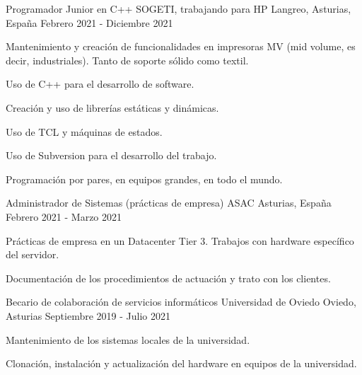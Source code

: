\begin{cventries}
    \cventry
    {Programador Junior en C++} %
    {SOGETI, trabajando para HP} %
    {Langreo, Asturias, España} %
    {Febrero 2021 - Diciembre 2021} %
    {
        \begin{cvitems} %
            \item {Mantenimiento y creación de funcionalidades en impresoras MV (mid volume, es decir, industriales).
                        Tanto de soporte sólido como textil.}
            \item {Uso de C++ para el desarrollo de software.}
            \item {Creación y uso de librerías estáticas y dinámicas.}
            \item {Uso de TCL y máquinas de estados.}
            \item {Uso de Subversion para el desarrollo del trabajo.}
            \item {Programación por pares, en equipos grandes, en todo el mundo.}
        \end{cvitems}
    }

    \cventry
    {Administrador de Sistemas (prácticas de empresa)} %
    {ASAC} %
    {Asturias, España} %
    {Febrero 2021 - Marzo 2021} %
    {
        \begin{cvitems} %
            \item {Prácticas de empresa en un Datacenter Tier 3. Trabajos con hardware específico del servidor.}
            \item {Documentación de los procedimientos de actuación y trato con los clientes.}
        \end{cvitems}
    }

    \cventry
    {Becario de colaboración de servicios informáticos} %
    {Universidad de Oviedo} %
    {Oviedo, Asturias} %
    {Septiembre 2019 - Julio 2021} %
    {
        \begin{cvitems} %
            \item {Mantenimiento de los sistemas locales de la universidad.}
            \item {Clonación, instalación y actualización del hardware en equipos de la universidad.}
        \end{cvitems}
    }

\end{cventries}
